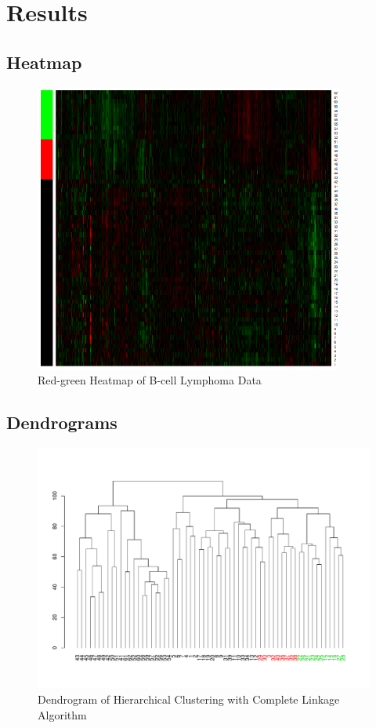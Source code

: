 \documentclass[11 pt,letterpaper,titlepage]{article} %
\begin{document}
\section{Results}
    \subsection{Heatmap}

    \begin{figure}[H]
        \centering
        \includegraphics[width=4in]{Figures/heatmap.png}
        \caption{Red-green Heatmap of B-cell Lymphoma Data}
        \label{fig:heatmap}
    \end{figure}

    \subsection{Dendrograms}
    \begin{figure}[H]
        \centering
        \includegraphics[width=5in]{Figures/dendComplete.pdf}
        \caption{Dendrogram of Hierarchical Clustering with Complete Linkage Algorithm}
        \label{fig:dend1}
    \end{figure}
\end{document}
